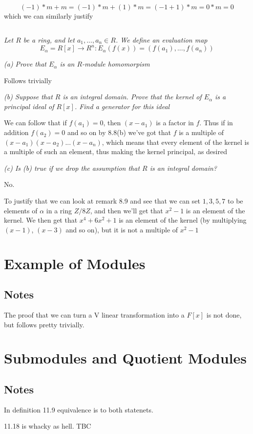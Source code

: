 \documentclass[11pt,oneside,titlepage]{book}
\begin{document}
$$(-1) * m + m = (-1) * m + (1) * m = (-1 + 1) * m = 0 * m = 0$$
which we can similarly justify

\subsection{}

\textit{Let $R$ be a ring, and let $a_1, ..., a_n \in R$. We define an evaluation map
  $$E_\alpha = R[x] \to R^n: E_\alpha(f(x)) = (f(a_1), ..., f(a_n))$$}

\textit{(a) Prove that $E_\alpha$ is an $R$-module homomorpism}

Follows trivially

\textit{(b) Suppose that $R$ is an integral domain. Prove that the
kernel of $E_\alpha$ is a principal ideal of $R[x]$. Find a generator for
this ideal}

We can follow that if $f(a_1) = 0$, then $(x - a_1)$ is a factor in
$f$. Thus if in addition $f(a_2) = 0$ and so on by 8.8(b) we've got
that $f$ is a multiple of $(x - a_1) (x - a_2)... (x - a_n)$, which
means that every element of the kernel is a multiple of such an
element, thus making the kernel principal, as desired

\textit{(c) Is (b) true if we drop the assumption that $R$ is an
  integral domain?}

No.

To justify that we can look at remark 8.9 and see that we can set $1,
3, 5, 7$ to be elements of $\alpha$ in a ring $Z/8Z$, and then we'll
get that $x^2 - 1$ is an element of the kernel. We then get that $x^4
+ 6x^2 + 1$ is an element of the kernel (by multiplying $(x - 1)$, $(x
- 3)$ and so on), but it is not a multiple of $x^2 - 1$

\section{Example of Modules}

\subsection*{Notes}

The proof that we can turn a V linear transformation into a $F[x]$ is
not done, but follows pretty trivially.


\section{Submodules and Quotient Modules}

\subsection*{Notes}

In definition 11.9 equivalence is to both statenets.

11.18 is whacky as hell. TBC
\end{document}
